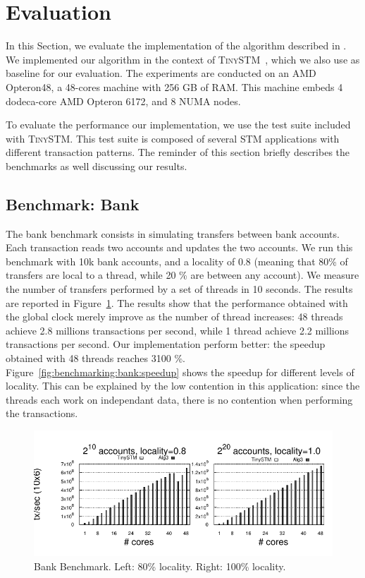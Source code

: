 \section{Evaluation}


In this Section, we evaluate the implementation of the algorithm
described in .  
We implemented our algorithm in the context of \textsc{TinySTM}~\cite{FelberFMR10}, which we also use as baseline for our evaluation. %
The experiments are conducted on an AMD Opteron48, a 48-cores machine with 256 GB of RAM. 
This machine embeds 4 dodeca-core AMD Opteron 6172, and 8 NUMA nodes.

To evaluate the performance our implementation, we use the test suite included with \textsc{TinySTM}. 
This test suite is composed of several STM applications with different transaction patterns.
The reminder of this section briefly describes the benchmarks as well discussing our results.
 
\subsection{Benchmark: Bank}

The bank benchmark consists in simulating transfers between bank accounts. 
Each transaction reads two accounts and updates the two accounts. 
We run this benchmark with 10k bank accounts, and a locality
of 0.8 (meaning that 80\% of transfers are local to a thread, while 20
\% are between any account). 
We measure the number of transfers performed by a set of threads in 10 seconds.
The results are reported in Figure~\ref{fig:benchmarking:bank}.%
%
The results show that the performance obtained with the global clock
merely improve as the number of thread increases: 48 threads achieve 2.8
millions transactions per second, while 1 thread achieve 2.2 millions
transactions per second.
%
Our implementation perform better: the speedup obtained with 48 threads reaches 3100 \%. 
Figure~\ref{fig:benchmarking:bank:speedup} shows the speedup for different levels of locality.
This  can be explained by the low contention in this application: since the threads each work on independant data, there is no contention when  performing the transactions.

\begin{figure}[!t]
	\centering
	\includegraphics[scale = 1.0]{results/intset/bank.pdf}
	\caption{Bank Benchmark. Left: 80\% locality. Right: 100\% locality.\label{fig:benchmarking:bank}}
\end{figure}


